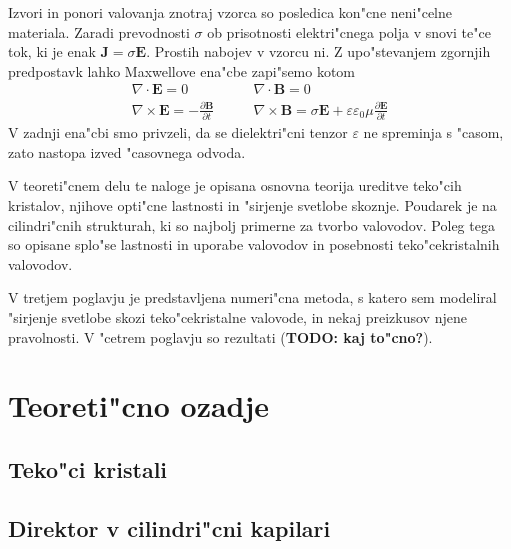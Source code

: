 \documentclass[a4paper,10pt]{article}
\newcommand{\todo}[1]{(\textbf{\textsc{TODO}: #1})}
\newcommand{\odvod}[2]{\frac{\partial #1}{\partial #2}}
\renewcommand{\vec}{\mathbf}
\begin{document}
Izvori in ponori valovanja znotraj vzorca so posledica kon"cne neni"celne materiala.
Zaradi prevodnosti $\sigma$ ob prisotnosti elektri"cnega polja v snovi te"ce tok, ki je enak $\vec J = \sigma \vec E$. 
Prostih nabojev v vzorcu ni. Z upo"stevanjem zgornjih predpostavk lahko Maxwellove ena"cbe zapi"semo kotom
\begin{equation}
  \begin{aligned}
  \nabla \cdot \vec E = 0 & \qquad \nabla \cdot \vec B = 0 \\
  \nabla \times \vec E = -\odvod{\vec B}{t} & \qquad \nabla \times \vec B = \sigma \vec E + \varepsilon\varepsilon_0\mu\odvod{\vec E}{t}
  \end{aligned}
\end{equation}
V zadnji ena"cbi smo privzeli, da se dielektri"cni tenzor $\varepsilon$ ne spreminja s "casom, zato nastopa izved "casovnega odvoda. 

V teoreti"cnem delu te naloge je opisana osnovna teorija ureditve teko"cih kristalov, njihove opti"cne lastnosti in "sirjenje svetlobe skoznje. 
Poudarek je na cilindri"cnih strukturah, ki so najbolj primerne za tvorbo valovodov. 
Poleg tega so opisane splo"se lastnosti in uporabe valovodov in posebnosti teko"cekristalnih valovodov. 

V tretjem poglavju je predstavljena numeri"cna metoda, s katero sem modeliral "sirjenje svetlobe skozi teko"cekristalne valovode, in nekaj preizkusov njene pravolnosti. 
V "cetrem poglavju so rezultati \todo{kaj to"cno?}. 

\section{Teoreti"cno ozadje}

\subsection{Teko"ci kristali}

\subsection{Direktor v cilindri"cni kapilari}
\end{document}
